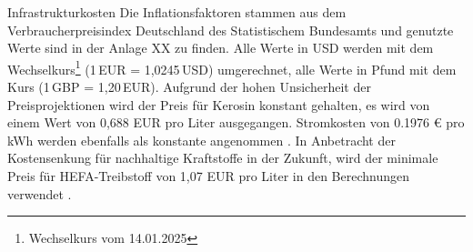
Infrastrukturkosten
%
Die Inflationsfaktoren stammen aus dem Verbraucherpreisindex Deutschland des Statistischem Bundesamts 
und genutzte Werte sind in der Anlage XX zu finden. %
Alle Werte in USD werden mit dem Wechselkurs\footnote{Wechselkurs vom 14.01.2025} (1 EUR = 1,0245 USD)
umgerechnet, alle Werte in Pfund mit dem Kurs (1 GBP = 1,20 EUR).
Aufgrund der hohen Unsicherheit der Preisprojektionen wird der Preis für Kerosin 
konstant gehalten, es wird von einem Wert von 0,688 EUR pro Liter \cite{iata_industry_statistics_2024} ausgegangen. 
Stromkosten von 0.1976 € pro kWh werden ebenfalls als konstante angenommen \cite{eurostat_nrg_pc_205}.
In Anbetracht der Kostensenkung für nachhaltige Kraftstoffe in der Zukunft, 
wird der minimale Preis für HEFA-Treibstoff von 1,07 EUR pro Liter in den Berechnungen verwendet \cite{watson2024sustainable}.








